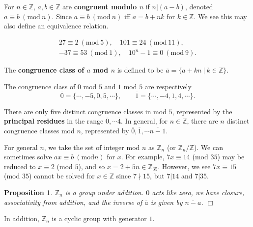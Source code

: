 \documentclass[letter-paper]{tufte-book}
\newtheorem{proposition}[theorem]{\color{pastel-blue}Proposition}
\newenvironment{example}[1][Example]{\begin{trivlist}
\item[\hskip \labelsep {\bfseries #1}]}{\end{trivlist}}
\newcommand\Def[1]{\textbf{#1}}
\newcommand{\qedwhite}{\hfill \ensuremath{\Box}}
\begin{document}
For $n\in\mathbb{Z}$, $a,b\in\mathbb{Z}$ are \Def{congruent modulo $n$} if
$n|(a-b)$, denoted $a\equiv b\ (\mbox{mod}\ n)$. Since $a\equiv b\ (\mbox{mod}\
n)$ iff $a=b+nk$ for $k\in\mathbb{Z}$. We see this may also define an
equivalence relation.
\begin{example}
  \begin{align*}
    27\equiv 2\ (\mbox{mod}\ 5),\quad 101\equiv 24\ (\mbox{mod}\ 11),\\
    -37\equiv 53\ (\mbox{mod}\ 1),\quad 10^n-1\equiv 0\ (\mbox{mod}\ 9).
  \end{align*}
\end{example}

The \Def{congruence class of $a$ mod $n$} is defined to be
$\overline{a}=\{a+kn\ |\ k\in\mathbb{Z}\}$.
\begin{example}
  The congruence class of $0$ mod $5$ and $1$ mod $5$ are respectively
  \begin{equation*}
    \overline{0}=\{\cdots,-5,0,5,\cdots\},\qquad
    \overline{1}=\{\cdots,-4,1,4,\cdots\}.
  \end{equation*}
\end{example}
There are only five distinct congruence classes in mod $5$, represented by the
\Def{principal residues} in the range $\overline{0},\cdots\overline{4}$.
In general, for $n\in\mathbb{Z}$, there are $n$ distinct congruence classes mod
$n$, represented by $\overline{0},\overline{1},\cdots\overline{n-1}$.

For general $n$, we take the set of integer mod $n$ as $\mathbb{Z}_n$ (or
$\mathbb{Z}_n/\mathbb{Z}$). We can sometimes solve $ax\equiv b\ (\mbox{mod}n)$
for $x$. For example, $7x\equiv14$ (mod $35$) may be reduced to $x\equiv2$ (mod
$5$), and so $x=2+5n\in\mathbb{Z}_{35}$. However, we see $7x\equiv15$ (mod $35$) cannot be solved for $x\in\mathbb{Z}$ since $7\nmid15$, but $7|14$ and $7|35$.

\begin{proposition}
  $\mathbb{Z}_n$ is a group under addition. $\overline{0}$ acts like zero, we
  have closure, associativity from addition, and the inverse of $\overline{a}$
  is given by $\overline{n-a}$. \qedwhite
\end{proposition}
In addition, $\mathbb{Z}_n$ is a cyclic group with generator $\overline{1}$.
\end{document}
